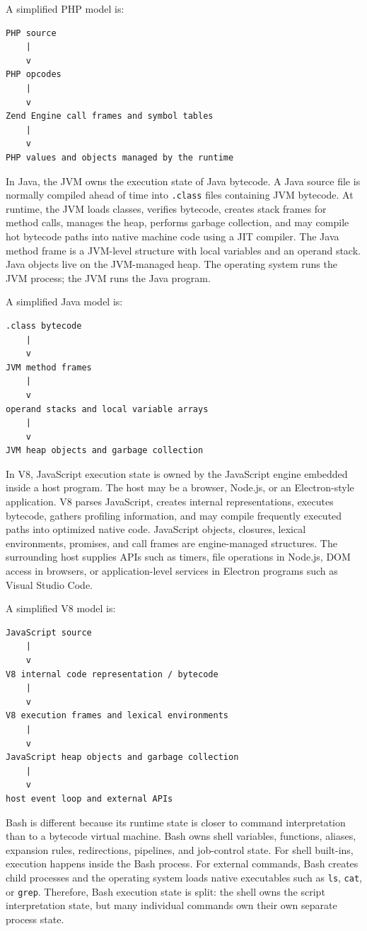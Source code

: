 A simplified PHP model is:

\begin{verbatim}
PHP source
    |
    v
PHP opcodes
    |
    v
Zend Engine call frames and symbol tables
    |
    v
PHP values and objects managed by the runtime
\end{verbatim}

In Java, the JVM owns the execution state of Java bytecode. A Java source file is normally compiled ahead of time into \texttt{.class} files containing JVM bytecode. At runtime, the JVM loads classes, verifies bytecode, creates stack frames for method calls, manages the heap, performs garbage collection, and may compile hot bytecode paths into native machine code using a JIT compiler. The Java method frame is a JVM-level structure with local variables and an operand stack. Java objects live on the JVM-managed heap. The operating system runs the JVM process; the JVM runs the Java program.

A simplified Java model is:

\begin{verbatim}
.class bytecode
    |
    v
JVM method frames
    |
    v
operand stacks and local variable arrays
    |
    v
JVM heap objects and garbage collection
\end{verbatim}

In V8, JavaScript execution state is owned by the JavaScript engine embedded inside a host program. The host may be a browser, Node.js, or an Electron-style application. V8 parses JavaScript, creates internal representations, executes bytecode, gathers profiling information, and may compile frequently executed paths into optimized native code. JavaScript objects, closures, lexical environments, promises, and call frames are engine-managed structures. The surrounding host supplies APIs such as timers, file operations in Node.js, DOM access in browsers, or application-level services in Electron programs such as Visual Studio Code.

A simplified V8 model is:

\begin{verbatim}
JavaScript source
    |
    v
V8 internal code representation / bytecode
    |
    v
V8 execution frames and lexical environments
    |
    v
JavaScript heap objects and garbage collection
    |
    v
host event loop and external APIs
\end{verbatim}

Bash is different because its runtime state is closer to command interpretation than to a bytecode virtual machine. Bash owns shell variables, functions, aliases, expansion rules, redirections, pipelines, and job-control state. For shell built-ins, execution happens inside the Bash process. For external commands, Bash creates child processes and the operating system loads native executables such as \texttt{ls}, \texttt{cat}, or \texttt{grep}. Therefore, Bash execution state is split: the shell owns the script interpretation state, but many individual commands own their own separate process state.

